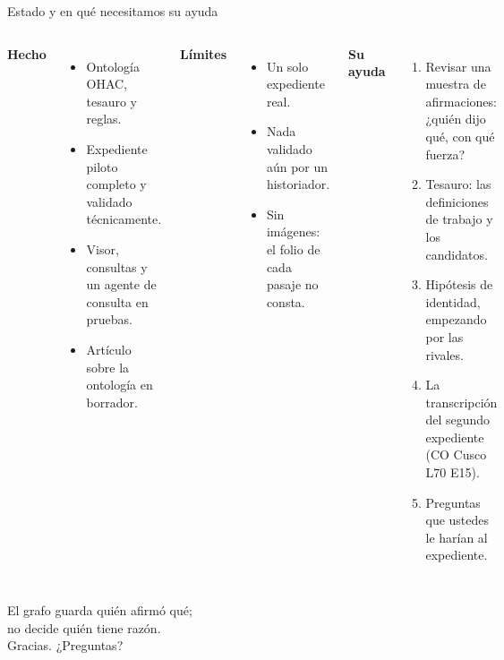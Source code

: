 \documentclass[aspectratio=169,10pt]{beamer}
\begin{document}
\begin{frame}{Estado y en qué necesitamos su ayuda}
\begin{columns}[T]
\small
\textbf{Hecho}
\begin{itemize}\footnotesize
\item Ontología OHAC, tesauro y reglas.
\item Expediente piloto completo y validado técnicamente.
\item Visor, consultas y un agente de consulta en pruebas.
\item Artículo sobre la ontología en borrador.
\end{itemize}
\textbf{Límites}
\begin{itemize}\footnotesize
\item Un solo expediente real.
\item Nada validado aún por un historiador.
\item Sin imágenes: el folio de cada pasaje no consta.
\end{itemize}
\small
\textbf{Su ayuda}
\begin{enumerate}\footnotesize
\item Revisar una muestra de afirmaciones: ¿quién dijo qué, con qué fuerza?
\item Tesauro: las \cifraDefinicionesDeTrabajo{} definiciones de trabajo y los \cifraCandidatos{} candidatos.
\item Hipótesis de identidad, empezando por las rivales.
\item La transcripción del segundo expediente (CO Cusco L70 E15).
\item Preguntas que ustedes le harían al expediente.
\end{enumerate}
\end{columns}
\end{frame}

\begin{frame}[standout]
El grafo guarda \alert{quién afirmó qué};\\ no decide quién tiene razón.\\[8pt]
Gracias. ¿Preguntas?
\end{frame}
\end{document}
